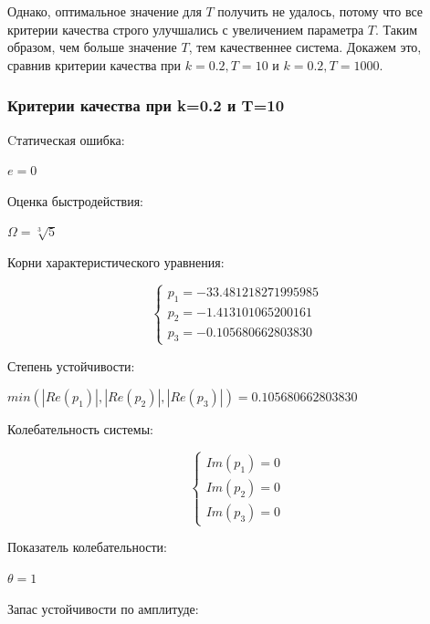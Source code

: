 \documentclass[14pt,a4paper,report]{report}
\begin{document}
Однако, оптимальное значение для $T$ получить не удалось, потому что все критерии качества строго улучшались с увеличением параметра $T$. Таким образом, чем больше значение $T$, тем качественнее система. Докажем это, сравнив критерии качества при $k=0.2, T=10$ и $k=0.2, T=1000$.

\subsubsection{Критерии качества при k=0.2 и T=10}

Cтатическая ошибка:

\begin{center}
$e=0$
\end{center}

Оценка быстродействия:

\begin{center}
$\Omega=\sqrt[3]{5}$
\end{center}

Корни характеристического уравнения:

\begin{equation*}
\begin{cases}
	\text{$p_1=-33.481218271995985$} \\
	\text{$p_2=-1.413101065200161$} \\
	\text{$p_3=-0.105680662803830$}
\end{cases}
\end{equation*}

Степень устойчивости:

\begin{center}
$min(|Re(p_1)|, |Re(p_2)|, |Re(p_3)|) = 0.105680662803830$
\end{center}

Колебательность системы:

\begin{equation*}
\begin{cases}
	\text{$Im(p_1)=0$} \\
	\text{$Im(p_2)=0$} \\
	\text{$Im(p_3)=0$}
\end{cases}
\end{equation*}

Показатель колебательности:

\begin{center}
$\theta=1$
\end{center}

\clearpage

Запас устойчивости по амплитуде:
\end{document}
